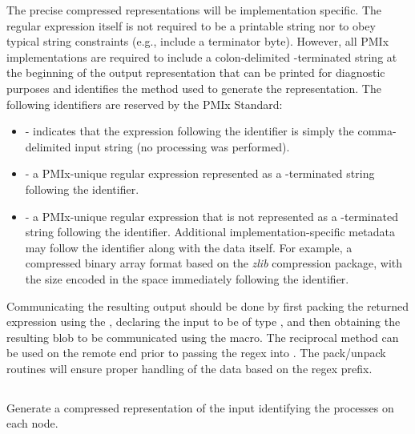 \label{regex:fmt}The precise compressed representations will be implementation specific. The regular expression itself is not required to be a printable string nor to obey typical string constraints (e.g., include a  terminator byte). However, all \ac{PMIx} implementations are required to include a colon-delimited -terminated string at the beginning of the output representation that can be printed for diagnostic purposes and identifies the method used to generate the representation. The following identifiers are reserved by the \ac{PMIx} Standard:

\begin{itemize}
    \item {} - indicates that the expression following the identifier is simply the comma-delimited input string (no processing was performed).
    \item {} - a \ac{PMIx}-unique regular expression represented as a -terminated string following the identifier.
    \item {} - a \ac{PMIx}-unique regular expression that is not represented as a -terminated string following the identifier. Additional implementation-specific metadata may follow the identifier along with the data itself. For example, a compressed binary array format based on the \emph{zlib} compression package, with the size encoded in the space immediately following the identifier.
\end{itemize}

Communicating the resulting output should be done by first packing the returned expression using the , declaring the input to be of type , and then obtaining the resulting blob to be communicated using the  macro. The reciprocal method can be used on the remote end prior to passing the regex into . The pack/unpack routines will ensure proper handling of the data based on the regex prefix.


\subsection{}

\summary

Generate a compressed representation of the input identifying the processes on each node.

